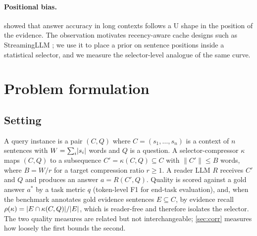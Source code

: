 \documentclass[preprint,12pt]{elsarticle}
\DeclarePairedDelimiter\abs{\lvert}{\rvert}
\theoremstyle{remark}
\begin{document}
\paragraph{Positional bias.}
\citet{liu2023lost} showed that answer accuracy in long contexts
follows a U shape in the position of the evidence. The observation
motivates recency-aware cache designs such as StreamingLLM
\citep{xiao2023streaming}; we use it to place a prior on sentence
positions inside a statistical selector, and we measure the
selector-level analogue of the same curve.

\section{Problem formulation}
\label{sec:formulation}

\subsection{Setting}
A query instance is a pair $(C, Q)$ where $C = (s_1, \ldots, s_n)$ is
a context of $n$ sentences with $W = \sum_i \abs{s_i}$ words and $Q$
is a question. A selector-compressor $\kappa$ maps $(C, Q)$ to a
subsequence $C' = \kappa(C, Q) \subseteq C$ with
$\lVert C' \rVert \le B$ words, where $B = W / r$ for a target
compression ratio $r \ge 1$. A reader LLM $R$ receives $C'$ and $Q$
and produces an answer $a = R(C', Q)$. Quality is scored against a
gold answer $a^{*}$ by a task metric $q$ (token-level F1 for end-task
evaluation), and, when the benchmark annotates gold evidence sentences
$E \subseteq C$, by evidence recall
$\rho(\kappa) = \abs{E \cap \kappa(C, Q)} / \abs{E}$, which is
reader-free and therefore isolates the selector. The two quality
measures are related but not interchangeable; \autoref{sec:corr}
measures how loosely the first bounds the second.
\end{document}
